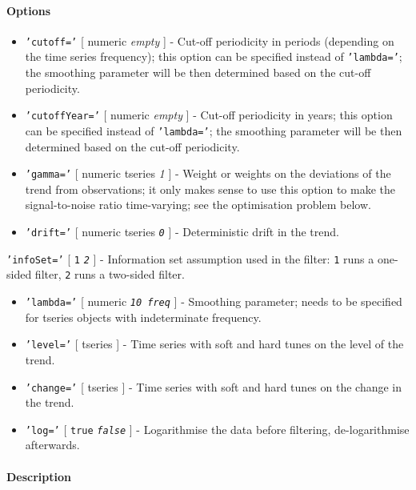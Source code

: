 \paragraph{Options}\label{options}

\begin{itemize}
\item
  \texttt{'cutoff='} {[} numeric \textbar{} \emph{empty} {]} - Cut-off
  periodicity in periods (depending on the time series frequency); this
  option can be specified instead of \texttt{'lambda='}; the smoothing
  parameter will be then determined based on the cut-off periodicity.
\item
  \texttt{'cutoffYear='} {[} numeric \textbar{} \emph{empty} {]} -
  Cut-off periodicity in years; this option can be specified instead of
  \texttt{'lambda='}; the smoothing parameter will be then determined
  based on the cut-off periodicity.
\item
  \texttt{'gamma='} {[} numeric \textbar{} tseries \textbar{} \emph{1}
  {]} - Weight or weights on the deviations of the trend from
  observations; it only makes sense to use this option to make the
  signal-to-noise ratio time-varying; see the optimisation problem
  below.
\item
  \texttt{'drift='} {[} numeric \textbar{} tseries \textbar{}
  \emph{\texttt{0}} {]} - Deterministic drift in the trend.
\end{itemize}

\texttt{'infoSet='} {[} \texttt{1} \textbar{} \emph{\texttt{2}} {]} -
Information set assumption used in the filter: \texttt{1} runs a
one-sided filter, \texttt{2} runs a two-sided filter.

\begin{itemize}
\item
  \texttt{'lambda='} {[} numeric \textbar{} \emph{\texttt{10 freq}} {]}
  - Smoothing parameter; needs to be specified for tseries objects with
  indeterminate frequency.
\item
  \texttt{'level='} {[} tseries {]} - Time series with soft and hard
  tunes on the level of the trend.
\item
  \texttt{'change='} {[} tseries {]} - Time series with soft and hard
  tunes on the change in the trend.
\item
  \texttt{'log='} {[} \texttt{true} \textbar{} \emph{\texttt{false}} {]}
  - Logarithmise the data before filtering, de-logarithmise afterwards.
\end{itemize}

\paragraph{Description}\label{description}

